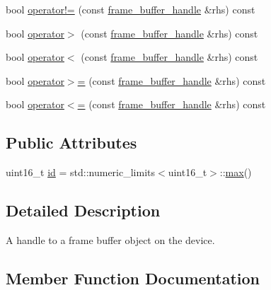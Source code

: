\begin{DoxyCompactItemize}
\item 
bool \mbox{\hyperlink{structmoka_1_1frame__buffer__handle_a98984b93552728bed0e67073c3412c3c}{operator!=}} (const \mbox{\hyperlink{structmoka_1_1frame__buffer__handle}{frame\+\_\+buffer\+\_\+handle}} \&rhs) const
\item 
bool \mbox{\hyperlink{structmoka_1_1frame__buffer__handle_a8d3069ff959b4df8113a6047de9a587f}{operator$>$}} (const \mbox{\hyperlink{structmoka_1_1frame__buffer__handle}{frame\+\_\+buffer\+\_\+handle}} \&rhs) const
\item 
bool \mbox{\hyperlink{structmoka_1_1frame__buffer__handle_a6647204ed60a12d61789981e99fa6c4f}{operator$<$}} (const \mbox{\hyperlink{structmoka_1_1frame__buffer__handle}{frame\+\_\+buffer\+\_\+handle}} \&rhs) const
\item 
bool \mbox{\hyperlink{structmoka_1_1frame__buffer__handle_a534fb2973b16baa39aa8961f9f9656cb}{operator$>$=}} (const \mbox{\hyperlink{structmoka_1_1frame__buffer__handle}{frame\+\_\+buffer\+\_\+handle}} \&rhs) const
\item 
bool \mbox{\hyperlink{structmoka_1_1frame__buffer__handle_aa624933fa41eacbe6900d7d79580629e}{operator$<$=}} (const \mbox{\hyperlink{structmoka_1_1frame__buffer__handle}{frame\+\_\+buffer\+\_\+handle}} \&rhs) const
\end{DoxyCompactItemize}
\subsection*{Public Attributes}
\begin{DoxyCompactItemize}
\item 
uint16\+\_\+t \mbox{\hyperlink{structmoka_1_1frame__buffer__handle_acb7144f84b9cf5ac4b0eb6af3aea0e27}{id}} = std\+::numeric\+\_\+limits$<$uint16\+\_\+t$>$\+::\mbox{\hyperlink{namespacemoka_acf03408f89c521244763fb5f8746ce16a2ffe4e77325d9a7152f7086ea7aa5114}{max}}()
\end{DoxyCompactItemize}


\subsection{Detailed Description}
A handle to a frame buffer object on the device. 

\subsection{Member Function Documentation}
\mbox{\label{structmoka_1_1frame__buffer__handle_a98984b93552728bed0e67073c3412c3c}} 
